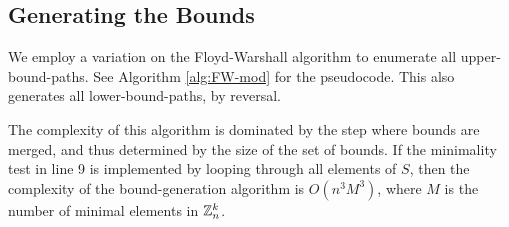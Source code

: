\documentclass[runningheads]{llncs}
\begin{document}
%
\subsection{Generating the Bounds}

We employ a variation on the Floyd-Warshall algorithm \cite{fw1962fwalg} to enumerate all upper-bound-paths. See Algorithm \ref{alg:FW-mod} for the pseudocode. This also generates all lower-bound-paths, by reversal.

\begin{algorithm}

  \BlankLine
\For{$s=1,\dots, n$}{
\For{$i=1,\dots, n$}{
\For{$j=i,\dots, n$}{
    \ForEach{$W_1\in\ubs(i,s)\text{ and }W_2\in \ubs(s,j)$}{ 
        \If{$W_1+W_2$ is minimal in $\ubs(i,j)\cup\{W_1 + W_2\}$}{
            $\ubs(i,j)\leftarrow \ubs(i,j) \cup\{W_1+W_2\}$\;
            $\ubs(j,i)\leftarrow \ubs(j,i)\cup \{ (W_1+W_2)\rev\}$\;
        }
    }
}}}

  \Return{\ubs}\;  
  \caption{Bound-Generation}\label{alg:FW-mod}
\end{algorithm}

The complexity of this algorithm is dominated by the step where bounds are merged, and thus determined by the size of the set of bounds. If the minimality test in line 9 is implemented by looping through all elements of $S$, then the complexity of the bound-generation algorithm is $O(n^3M^3)$, where $M$ is the number of minimal elements in $\mathbb Z^k_n$. 
\end{document}
